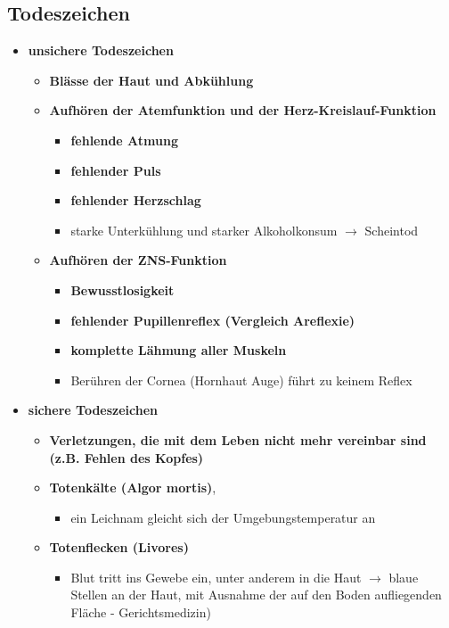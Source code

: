 \subsection{Todeszeichen}
	\begin{itemize}
		\item \textbf{unsichere Todeszeichen}
			\begin{itemize}
				\item \textbf{Blässe der Haut und Abkühlung}
				\item \textbf{Aufhören der Atemfunktion und der Herz-Kreislauf-Funktion}
					\begin{itemize}
						\item \textbf{fehlende Atmung}
						\item \textbf{fehlender Puls}
						\item \textbf{fehlender Herzschlag}
						\item starke Unterkühlung und starker Alkoholkonsum $\rightarrow$ Scheintod
					\end{itemize}
				\item \textbf{Aufhören der ZNS-Funktion}
					\begin{itemize}
						\item \textbf{Bewusstlosigkeit}
						\item \textbf{fehlender Pupillenreflex (Vergleich Areflexie)}
						\item \textbf{komplette Lähmung aller Muskeln}
						\item Berühren der Cornea (Hornhaut Auge) führt zu keinem Reflex
					\end{itemize}
			\end{itemize}
		\item \textbf{sichere Todeszeichen}
			\begin{itemize}
				\item \textbf{Verletzungen, die mit dem Leben nicht mehr vereinbar sind (z.B. Fehlen des Kopfes)}
				\item \textbf{Totenkälte (Algor mortis)}, 
					\begin{itemize}
						\item ein Leichnam gleicht sich der Umgebungstemperatur an
					\end{itemize}
				\item \textbf{Totenflecken (Livores)}
					\begin{itemize}
						\item Blut tritt ins Gewebe ein, unter anderem in die Haut $\rightarrow$ blaue Stellen an der Haut, mit Ausnahme der auf den Boden aufliegenden Fläche - Gerichtsmedizin)

\end{itemize}
\end{itemize}
\end{itemize}
